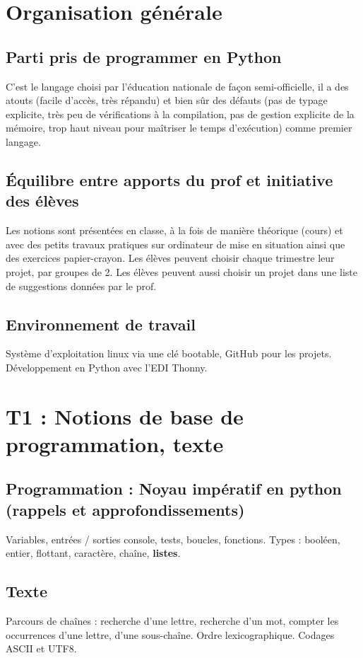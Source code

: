 \documentclass[a4paper,11pt,DIV11,BCOR0mm]{scrartcl}
\begin{document}
\section*{Organisation générale}
\subsection*{Parti pris de programmer en Python}
C'est le langage choisi par l'éducation nationale de façon
semi-officielle, il a des atouts (facile d'accès, très répandu) et 
bien sûr des défauts (pas de typage explicite, très peu de vérifications
à la compilation, pas de gestion explicite de la mémoire, trop haut niveau
pour maîtriser le temps d'exécution)
comme premier langage.
\subsection*{Équilibre entre apports du prof et initiative des élèves}
Les notions sont présentées en classe, à la fois de manière
théorique (cours) et avec des petits travaux pratiques sur ordinateur
 de mise en situation ainsi
que des exercices papier-crayon.
Les élèves peuvent choisir chaque trimestre leur projet,
par groupes de 2. Les élèves peuvent aussi choisir un
projet dans une liste de suggestions données par le prof.
\subsection*{Environnement de travail}
Système d'exploitation linux via une clé bootable, GitHub pour les projets.
Développement en Python avec l'EDI Thonny.

\section*{T1 : Notions de base de programmation, texte}
\subsection*{Programmation : Noyau impératif en python (rappels et \textbf{approfondissements})}
Variables, entrées / sorties console, tests, boucles, fonctions.
Types : booléen, entier, flottant, caractère, chaîne, \textbf{listes}.
\subsection*{Texte}
Parcours de chaînes : recherche d'une lettre, recherche d'un mot, compter les occurrences
d'une lettre, d'une sous-chaîne. Ordre lexicographique. Codages ASCII et UTF8.
\end{document}

